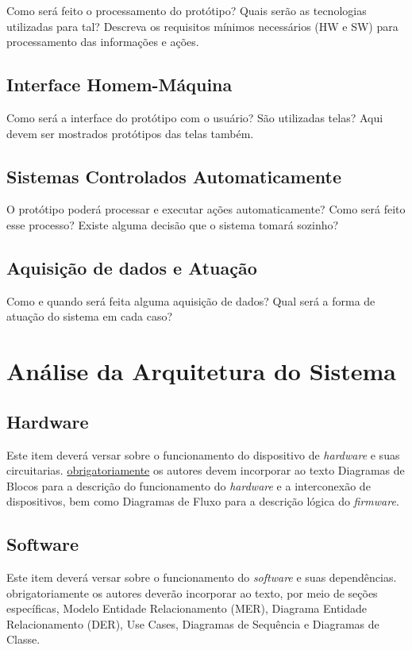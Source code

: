 Como será feito o processamento do protótipo? Quais serão as tecnologias utilizadas para tal? Descreva os requisitos mínimos necessários (HW e SW) para processamento das informações e ações.

\subsection{Interface Homem-Máquina}

Como será a interface do protótipo com o usuário? São utilizadas telas? Aqui devem ser mostrados protótipos das telas também.

\subsection{Sistemas Controlados Automaticamente}

O protótipo poderá processar e executar ações automaticamente? Como será feito esse processo? Existe alguma decisão que o sistema tomará sozinho?

\subsection{Aquisição de dados e Atuação}

Como e quando será feita alguma aquisição de dados? Qual será a forma de atuação do sistema em cada caso?

\section{Análise da Arquitetura do Sistema}

\subsection{Hardware}

Este item deverá versar sobre o funcionamento do dispositivo de \textit{hardware} e suas circuitarias. \underline{obrigatoriamente} os autores devem incorporar ao texto Diagramas de Blocos para a descrição do funcionamento do \textit{hardware} e a interconexão de dispositivos, bem como Diagramas de Fluxo para a descrição lógica do \textit{firmware}.

\subsection{Software}

Este item deverá versar sobre o funcionamento do \textit{software} e suas dependências. obrigatoriamente os autores deverão incorporar ao texto, por meio de seções específicas, Modelo Entidade Relacionamento (MER), Diagrama Entidade Relacionamento (DER), Use Cases, Diagramas de Sequência e Diagramas de Classe.
